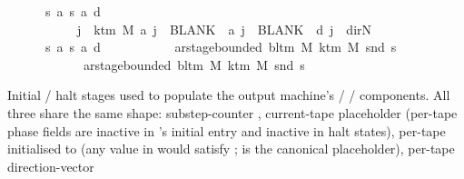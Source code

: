 \begin{isabellebody}
\ \ \ \ \ {\isasyminter}\ {\isacharbraceleft}{\kern0pt}{\isacharparenleft}{\kern0pt}s{\isacharcomma}{\kern0pt}\ a{\isacharcomma}{\kern0pt}\ s{\isacharprime}{\kern0pt}{\isacharcomma}{\kern0pt}\ a{\isacharprime}{\kern0pt}{\isacharcomma}{\kern0pt}\ d{\isacharparenright}{\kern0pt}{\isachardot}{\kern0pt}\isanewline
\ \ \ \ \ \ \ \ \ \ \ {\isasymforall}j\ {\isasymge}\ k{\isacharunderscore}{\kern0pt}tm\ M{\isachardot}{\kern0pt}\ a\ j\ {\isacharequal}{\kern0pt}\ BLANK{}\ {\isasymand}\ a{\isacharprime}{\kern0pt}\ j\ {\isacharequal}{\kern0pt}\ BLANK{}\ {\isasymand}\ d\ j\ {\isacharequal}{\kern0pt}\ dir{\isachardot}{\kern0pt}N{\isacharbraceright}{\kern0pt}\isanewline
\ \ \ \ \ {\isasyminter}\ {\isacharbraceleft}{\kern0pt}{\isacharparenleft}{\kern0pt}s{\isacharcomma}{\kern0pt}\ a{\isacharcomma}{\kern0pt}\ s{\isacharprime}{\kern0pt}{\isacharcomma}{\kern0pt}\ a{\isacharprime}{\kern0pt}{\isacharcomma}{\kern0pt}\ d{\isacharparenright}{\kern0pt}{\isachardot}{\kern0pt}\isanewline
\ \ \ \ \ \ \ \ \ \ \ ar{\isacharunderscore}{\kern0pt}stage{\isacharunderscore}{\kern0pt}bounded\ {\isacharparenleft}{\kern0pt}bl{\isacharunderscore}{\kern0pt}tm\ M{\isacharparenright}{\kern0pt}\ {\isacharparenleft}{\kern0pt}k{\isacharunderscore}{\kern0pt}tm\ M{\isacharparenright}{\kern0pt}\ {\isacharparenleft}{\kern0pt}snd\ s{\isacharparenright}{\kern0pt}\isanewline
\ \ \ \ \ \ \ \ \ \ \ {\isasymand}\ ar{\isacharunderscore}{\kern0pt}stage{\isacharunderscore}{\kern0pt}bounded\ {\isacharparenleft}{\kern0pt}bl{\isacharunderscore}{\kern0pt}tm\ M{\isacharparenright}{\kern0pt}\ {\isacharparenleft}{\kern0pt}k{\isacharunderscore}{\kern0pt}tm\ M{\isacharparenright}{\kern0pt}\ {\isacharparenleft}{\kern0pt}snd\ s{\isacharprime}{\kern0pt}{\isacharparenright}{\kern0pt}{\isacharbraceright}{\kern0pt}{\isachardoublequoteclose}%
\begin{isamarkuptext}%
Initial / halt stages used to populate the output
  machine's  /  / 
  components.  All three share the same shape: substep-counter
  , current-tape 
  placeholder (per-tape phase fields are inactive in
  's initial entry and inactive in halt
  states), per-tape  initialised to
   (any value in  would
  satisfy ;  is the
  canonical placeholder), per-tape direction-vector

\end{isamarkuptext}
\end{isabellebody}

